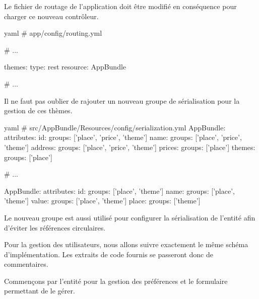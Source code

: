 \documentclass[big]{zmdocument}
\begin{document}
Le fichier de routage de l'application doit être modifié en conséquence pour charger ce nouveau contrôleur.



\begin{CodeBlock}{yaml}
# app/config/routing.yml

# ...

themes:
    type:     rest
    resource: AppBundle\Controller\Place\ThemeController

# ...
\end{CodeBlock}



Il ne faut pas oublier de rajouter un nouveau groupe de sérialisation pour la gestion de ces thèmes.



\begin{CodeBlock}{yaml}
# src/AppBundle/Resources/config/serialization.yml
AppBundle\Entity\Place:
    attributes:
        id:
            groups: ['place', 'price', 'theme']
        name:
            groups: ['place', 'price', 'theme']
        address:
            groups: ['place', 'price', 'theme']
        prices:
            groups: ['place']
        themes:
            groups: ['place']

# ...

AppBundle\Entity\Theme:
    attributes:
        id:
            groups: ['place', 'theme']
        name:
            groups: ['place', 'theme']
        value:
            groups: ['place', 'theme']
        place:
            groups: ['theme']
\end{CodeBlock}



\begin{Information}
Le nouveau groupe est aussi utilisé pour configurer la sérialisation de l'entité afin  d'éviter les références circulaires.
\end{Information}




Pour la gestion des utilisateurs, nous allons suivre exactement le même schéma d'implémentation. Les extraits de code fournis se passeront donc de commentaires.



Commençons par l'entité pour la gestion des préférences et le formulaire permettant de le gérer.
\end{document}
